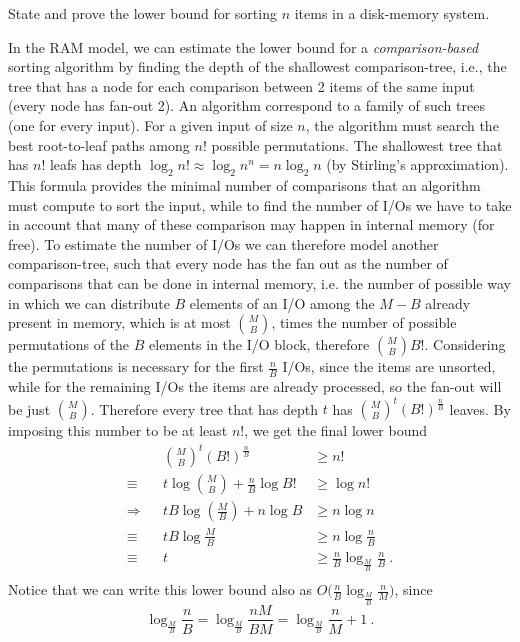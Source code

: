 \exercise

State and prove the lower bound for sorting $n$ items in a disk-memory system.

\solution

In the RAM model, we can estimate the lower bound for a \emph{comparison-based}
sorting algorithm by finding the depth of the shallowest comparison-tree, i.e.,
the tree that has a node for each comparison between 2 items of the same input
(every node has fan-out 2). An algorithm correspond to a family of such trees
(one for every input). For a given input of size $n$, the algorithm must search
the best root-to-leaf paths among $n!$ possible permutations. The shallowest
tree that has $n!$ leafs has depth $\log_2 n! \approx \log_2 n^n = n\log_2 n$
(by Stirling's approximation). This formula provides the minimal number of
comparisons that an algorithm must compute to sort the input, while to find the
number of I/Os we have to take in account that many of these comparison may
happen in internal memory (for free). To estimate the number of I/Os we can
therefore model another comparison-tree, such that every node has the fan out as
the number of comparisons that can be done in internal memory, i.e. the number
of possible way in which we can distribute $B$ elements of an I/O among the $M -
B$ already present in memory, which is at most ${M}\choose{B}$, times the number
of possible permutations of the $B$ elements in the I/O block, therefore ${M
\choose B} B!$. Considering the permutations is necessary for the first
$\frac{n}{B}$ I/Os, since the items are unsorted, while for the remaining I/Os
the items are already processed, so the fan-out will be just $M \choose B$.
Therefore every tree that has depth $t$ has ${M \choose B}^t (B!)^\frac{n}{B}$
leaves. By imposing this number to be at least $n!$, we get the final lower bound
%
\begin{align*}
              && && && && {M \choose B}^t (B!)^\frac{n}{B} &\ge n! && && &&\\
  && && && \equiv      && t\log{{M \choose B}} + \frac{n}{B}\log{B!} &\ge \log{n!} && && &&\\
  && && && \Rightarrow && tB\log{\left(\frac{M}{B}\right)} + n\log{B} &\ge n\log{n} && && &&\\
  && && && \equiv      && tB\log{\frac{M}{B}} &\ge n\log{\frac{n}{B}} && && &&\\
  && && && \equiv      && t &\ge \frac{n}{B}\log_{\frac{M}{B}}{\frac{n}{B}}\ . && && &&\\
\end{align*}
%
Notice that we can write this lower bound also as $O\big(\frac{n}{B}
\log_{\frac{M}{B}} \frac{n}{M}\big)$, since $$\log_{\frac{M}{B}} \frac{n}{B} =
\log_{\frac{M}{B}} \frac{nM}{BM} = \log_{\frac{M}{B}} \frac{n}{M} + 1\ .$$
